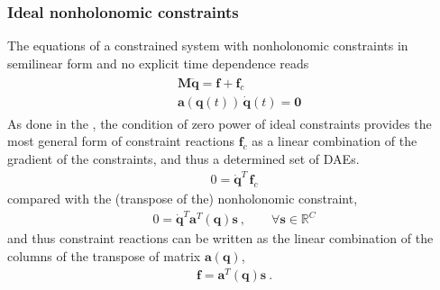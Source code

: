 \documentclass[letterpaper,10pt,english]{jupyterBook}
\begin{document}
\subsubsection{Ideal non\sphinxhyphen{}holonomic constraints}
\label{\detokenize{ch/lagrange-constraints:classical-mechanics-lagrange-constraints-ideal-non-holonomic}}\label{\detokenize{ch/lagrange-constraints:ideal-non-holonomic-constraints}}
\sphinxAtStartPar
The equations of a constrained system with non\sphinxhyphen{}holonomic constraints in semi\sphinxhyphen{}linear form and no explicit time dependence reads
\begin{equation*}
\begin{split}\begin{aligned}
  & \mathbf{M} \ddot{\mathbf{q}} = \mathbf{f} + \mathbf{f}_c \\
  & \mathbf{a}(\mathbf{q}(t)) \, \dot{\mathbf{q}}(t) = \mathbf{0}
\end{aligned}\end{split}
\end{equation*}
\sphinxAtStartPar
{} As done in the {\hyperref[\detokenize{ch/lagrange-constraints:classical-mechanics-lagrange-constraints-ideal-holonomic}]{}}, the condition of zero power of ideal constraints provides the most general form of constraint reactions \(\mathbf{f}_c\) as a linear combination of the gradient of the constraints, and thus a determined set of DAEs.
\begin{equation*}
\begin{split}0 = \dot{\mathbf{q}}^T \, \mathbf{f}_c\end{split}
\end{equation*}
\sphinxAtStartPar
compared with the (transpose of the) non\sphinxhyphen{}holonomic constraint,
\begin{equation*}
\begin{split}0 = \dot{\mathbf{q}}^T \mathbf{a}^T(\mathbf{q}) \mathbf{s}  \ , \qquad \forall \mathbf{s} \in \mathbb{R}^C\end{split}
\end{equation*}
\sphinxAtStartPar
and thus constraint reactions can be written as the linear combination of the columns of the transpose of matrix \(\mathbf{a}(\mathbf{q})\),
\begin{equation}\label{equation:ch/lagrange-constraints:eq:constraint:reaction:non-holonomic}
\begin{split}\mathbf{f} = \mathbf{a}^T(\mathbf{q}) \mathbf{s} \ .\end{split}
\end{equation}
\end{document}
